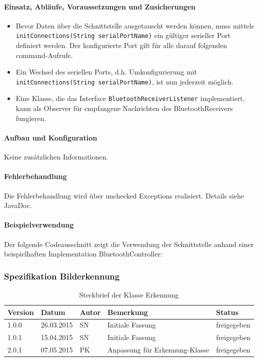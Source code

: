 \paragraph{Einsatz, Abläufe, Voraussetzungen und Zusicherungen}
\begin{itemize}
	\item{Bevor Daten über die Schnittstelle ausgetauscht werden können, muss mittels 
\verb?initConnections(String serialPortName)? ein gültiger serieller Port definiert werden. Der konfigurierte Port gilt für alle darauf folgenden command-Aufrufe. }
	\item{Ein Wechsel des seriellen Ports, d.h. Umkonfigurierung mit \verb?initConnections(String serialPortName)?, ist nun jederzeit möglich.}
	\item{Eine Klasse, die das Interface \verb?BluetoothReceiverListener? implementiert, kann als Observer für empfangene Nachrichten des BluetoothReceivers fungieren.}
\end{itemize}
\paragraph{Aufbau und Konfiguration} 
Keine zusätzlichen Informationen. \\
\paragraph{Fehlerbehandlung}
Die Fehlerbehandlung wird über unchecked Exceptions realisiert. Details siehe JavaDoc. \\
\paragraph{Beispielverwendung}
Der folgende Codeausschnitt zeigt die Verwendung der Schnittstelle anhand einer beispielhaften Implementation BluetoothController: \\


\subsubsection{Spezifikation Bilderkennung}


\begin{table}[h!]
	\begin{tabular}{|l|l|l|l|l|}
		\hline 
		Version & Datum & Autor & Bemerkung & Status \\ 
		\hline 
		1.0.0 & 26.03.2015 & SN & Initiale Fassung & freigegeben \\ 
		\hline 
		1.0.1 & 15.04.2015 & SN & Initiale Fassung & freigegeben \\ 
		\hline 
		2.0.1 & 07.05.2015 & PK & Anpassung für Erkennung-Klasse & freigegeben \\ 
		\hline 
	\end{tabular} 
	\caption{Steckbrief der Klasse Erkennung}
\end{table}

